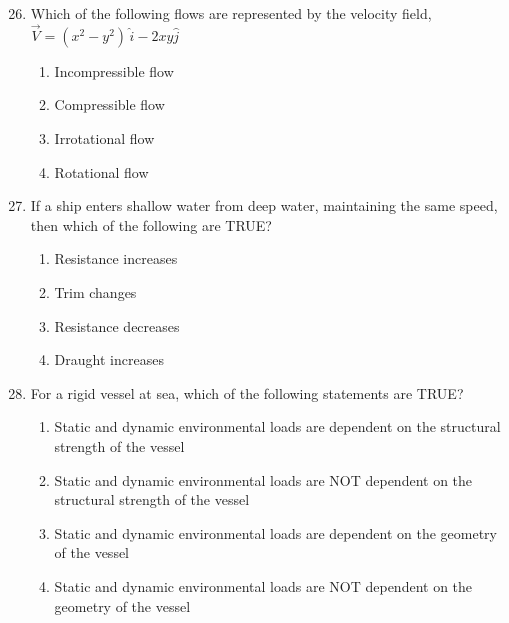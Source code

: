 \documentclass[journal]{IEEEtran}
\theoremstyle{remark}
\begin{document}
\newpage
\vspace*{0.25cm}

\begin{enumerate}[itemsep=1em]
\setcounter{enumi}{25}
\item Which of the following flows are represented by the velocity field,\\ $\overrightarrow{V} = (x^2-y^2)\,\hat{i} - 2xy\hat{j}$
\begin{enumerate}[leftmargin=2.5em, labelsep=0.5em, itemsep=0.5em]
    \item Incompressible flow 
    \item Compressible flow 
    \item Irrotational flow 
    \item Rotational flow 
\end{enumerate}    
\end{enumerate}

\begin{enumerate}[itemsep=1em]
\setcounter{enumi}{26}
\item If a ship enters shallow water from deep water, maintaining the same speed, then which of the following are TRUE? 
\begin{enumerate}[leftmargin=2.5em, labelsep=0.5em, itemsep=0.5em]
    \item Resistance increases 
    \item Trim changes 
    \item Resistance decreases 
    \item Draught increases 
\end{enumerate}
\end{enumerate}

\begin{enumerate}[itemsep=1em]
\setcounter{enumi}{27}
\item For a rigid vessel at sea, which of the following statements are TRUE?
\begin{enumerate}[leftmargin=2.5em, labelsep=0.5em, itemsep=0.5em]
    \item Static and dynamic environmental loads are dependent on the structural strength of the vessel 
    \item Static and dynamic environmental loads are NOT dependent on the structural strength of the vessel 
    \item Static and dynamic environmental loads are dependent on the geometry of the vessel 
    \item Static and dynamic environmental loads are NOT dependent on the geometry of the vessel 
\end{enumerate}
\end{enumerate}
\end{document}
